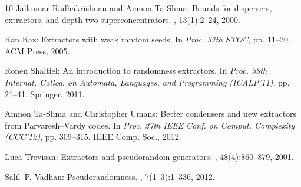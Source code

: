\documentclass[11pt]{article}
\numberwithin{equation}{section}
\theoremstyle{definition}
\theoremstyle{plain}
\begin{document}
\begin{thebibliography}{10}
{\sc Jaikumar Radhakrishnan and Amnon Ta-Shma}: Bounds for dispersers,
  extractors, and depth-two superconcentrators.
, 13(1):2--24, 2000.
\newblock [\epfmtdoi{10.1137/S0895480197329508}]

{\sc Ran Raz}: Extractors with weak random seeds.
\newblock In {\em Proc. 37th STOC}, pp. 11--20. ACM Press, 2005.
\newblock [\epfmtdoi{10.1145/1060590.1060593}]

{\sc Ronen Shaltiel}: An introduction to randomness extractors.
\newblock In {\em Proc. 38th Internat. Colloq. on Automata, Languages, and
  Programming (ICALP'11)}, pp. 21--41. Springer, 2011.
\newblock [\epfmtdoi{10.1007/978-3-642-22012-8\_2}]

{\sc Amnon Ta-Shma and Christopher Umans}: Better condensers and new extractors
  from {P}arvaresh--{V}ardy codes.
\newblock In {\em Proc. 27th IEEE Conf. on Comput. Complexity (CCC'12)}, pp.
  309--315. IEEE Comp. Soc., 2012.

{\sc Luca Trevisan}: Extractors and pseudorandom generators.
, 48(4):860--879, 2001.
\newblock [\epfmtdoi{10.1145/502090.502099}]

{\sc Salil~P. Vadhan}: Pseudorandomness.
, 7(1--3):1--336, 2012.
\newblock [\epfmtdoi{10.1561/0400000010}]

\end{thebibliography}
\end{document}
